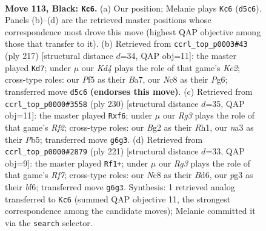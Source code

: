 \documentclass[11pt]{article}
\begin{document}
\clearpage

\begin{figure}[p]\centering
\begin{subfigure}{0.46\textwidth}\centering
\resizebox{\linewidth}{!}{%
\newchessgame
\chessboard[
  setfen={2n4K/8/p5r1/P2k1p1p/5B2/N5P1/6b1/R7 b - - 37 113},
  showmover=false,
  pgfstyle=straightmove, color=movearrow, markmove={d5-c6}
]}
\caption{}
\end{subfigure}\hfill
\begin{subfigure}{0.46\textwidth}\centering
\resizebox{\linewidth}{!}{%
\newchessgame
\chessboard[
  setfen={8/bB2k3/P5p1/1bp4p/7P/2B1K1P1/8/8 b - - 8 109},
  showmover=false,
  pgfstyle=straightmove, color=movearrow, markmove={e7-d7}
]}
\caption{}
\end{subfigure}
\\[4pt]
\begin{subfigure}{0.46\textwidth}\centering
\resizebox{\linewidth}{!}{%
\newchessgame
\chessboard[
  setfen={3r2k1/8/5bP1/1Pp1p3/P7/3p4/5R2/1K5R w - - 0 116},
  showmover=false,
  pgfstyle=straightmove, color=movearrow, markmove={f2-f6}
]}
\caption{}
\end{subfigure}\hfill
\begin{subfigure}{0.46\textwidth}\centering
\resizebox{\linewidth}{!}{%
\newchessgame
\chessboard[
  setfen={8/1k6/3b1BRp/2p5/P1P5/1P6/5r2/1K6 b - - 2 111},
  showmover=false,
  pgfstyle=straightmove, color=movearrow, markmove={f2-f1}
]}
\caption{}
\end{subfigure}
\caption{\textbf{Move 113, Black: \texttt{Kc6}.} (a) Our position; Melanie plays \texttt{Kc6} (\texttt{d5c6}). Panels (b)--(d) are the retrieved master positions whose correspondence most drove this move (highest QAP objective among those that transfer to it). (b) Retrieved from \texttt{ccrl\_top\_p0003\#43} (ply 217) [structural distance $d$=34, QAP obj=11]: the master played \texttt{Kd7}; under $\mu$ our \emph{Kd4} plays the role of that game's \emph{Ke2}; cross-type roles: our \emph{P}f5 as their \emph{B}a7, our \emph{N}c8 as their \emph{P}g6; transferred move \texttt{d5c6} \textbf{(endorses this move)}. (c) Retrieved from \texttt{ccrl\_top\_p0000\#3558} (ply 230) [structural distance $d$=35, QAP obj=11]: the master played \texttt{Rxf6}; under $\mu$ our \emph{Rg3} plays the role of that game's \emph{Rf2}; cross-type roles: our \emph{B}g2 as their \emph{R}h1, our \emph{n}a3 as their \emph{P}b5; transferred move \texttt{g6g3}. (d) Retrieved from \texttt{ccrl\_top\_p0000\#2879} (ply 221) [structural distance $d$=33, QAP obj=9]: the master played \texttt{Rf1+}; under $\mu$ our \emph{Rg3} plays the role of that game's \emph{Rf7}; cross-type roles: our \emph{N}c8 as their \emph{B}d6, our \emph{p}g3 as their \emph{b}f6; transferred move \texttt{g6g3}. Synthesis: 1 retrieved analog transferred to \texttt{Kc6} (summed QAP objective 11, the strongest correspondence among the candidate moves); Melanie committed it via the \texttt{search} selector.}
\label{fig:thought-m225}
\end{figure}
\end{document}

